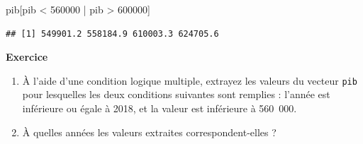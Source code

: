 \documentclass[
  11pt,
]{book}
\newenvironment{Shaded}{\begin{snugshade}}{\end{snugshade}}
\newcommand{\DecValTok}[1]{\textcolor[rgb]{0.00,0.00,0.81}{#1}}
\newcommand{\NormalTok}[1]{#1}
\newcommand{\SpecialCharTok}[1]{\textcolor[rgb]{0.00,0.00,0.00}{#1}}
\providecommand{\tightlist}{%
  \setlength{\itemsep}{0pt}\setlength{\parskip}{0pt}}
\numberwithin{equation}{section}
\numberwithin{countremarque}{section}
\newenvironment{greenbox}{
  \begin{tcolorbox}[breakable, colback=vert,coltext=black,
                  colframe=grisfonce]}
 {\end{tcolorbox}}
\begin{document}
\begin{Shaded}
\begin{Highlighting}[]
\NormalTok{pib[pib }\SpecialCharTok{\textless{}} \DecValTok{560000} \SpecialCharTok{|}\NormalTok{ pib }\SpecialCharTok{\textgreater{}} \DecValTok{600000}\NormalTok{]}
\end{Highlighting}
\end{Shaded}

\begin{lstlisting}
## [1] 549901.2 558184.9 610003.3 624705.6
\end{lstlisting}

\begin{greenbox}

\textbf{Exercice}

\begin{enumerate}
\def\labelenumi{\arabic{enumi}.}
\tightlist
\item
  À l'aide d'une condition logique multiple, extrayez les valeurs du vecteur \texttt{pib} pour lesquelles les deux conditions suivantes sont remplies : l'année est inférieure ou égale à 2018, et la valeur est inférieure à 560~000.
\item
  À quelles années les valeurs extraites correspondent-elles ?
\end{enumerate}

\end{greenbox}
\end{document}
